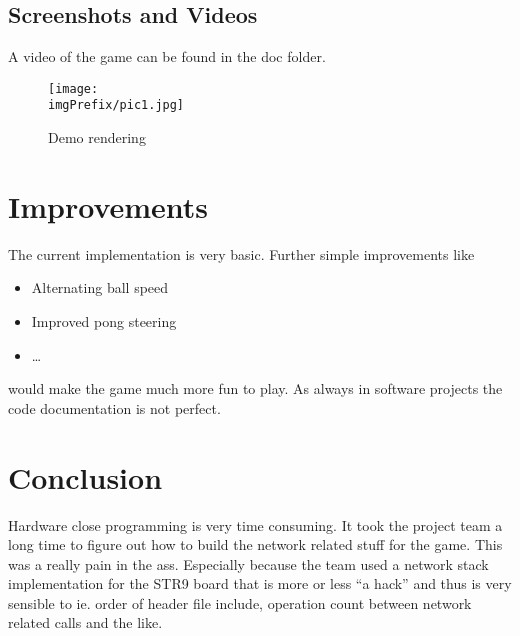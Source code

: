 \subsection{Screenshots and Videos}
A video of the game can be found in the doc folder. 
\begin{figure}[h!]%
	\centering
	\texttt{[image: \\imgPrefix/pic1.jpg]}
	\caption{Demo rendering}
\end{figure}

\newpage
\section{Improvements}
The current implementation is very basic. Further simple improvements like
\begin{itemize}
  \item Alternating ball speed
  \item Improved pong steering
  \item \ldots
\end{itemize}
would make the game much more fun to play.
As always in software projects the code documentation is not perfect.
   

\newpage
\section{Conclusion}
Hardware close programming is very time consuming. It took the project team a
long time to figure out how to build the network related stuff for the game.
This was a really pain in the ass. Especially because the team used a
network stack implementation for the STR9 board that is more or less ``a
hack'' and thus is very sensible to ie. order of header file include, operation
count between network related calls and the like. 


